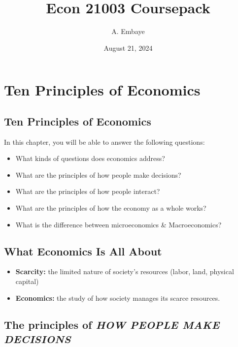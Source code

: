 \documentclass[
]{book}
\title{Econ 21003 Coursepack}
\author{A. Embaye}
\date{August 21, 2024}
\begin{document}
\maketitle

{
\setcounter{tocdepth}{0}
\tableofcontents
}
\hypertarget{ten-principles-of-economics}{%
\chapter{Ten Principles of Economics}\label{ten-principles-of-economics}}

\hypertarget{ten-principles-of-economics-1}{%
\section{Ten Principles of Economics}\label{ten-principles-of-economics-1}}

In this chapter, you will be able to answer the following questions:

\begin{itemize}
\item
  What kinds of questions does economics address?
\item
  What are the principles of how people make decisions?
\item
  What are the principles of how people interact?
\item
  What are the principles of how the economy as a whole works?
\item
  What is the difference between microeconomics \& Macroeconomics?
\end{itemize}

\hypertarget{what-economics-is-all-about}{%
\section{What Economics Is All About}\label{what-economics-is-all-about}}

\begin{itemize}
\item
  \textbf{Scarcity:} the limited nature of society's resources (labor, land, physical capital)
\item
  \textbf{Economics:} the study of how society manages its scarce resources.
\end{itemize}

\hypertarget{the-principles-of-how-people-make-decisions}{%
\section{\texorpdfstring{The principles of \textbf{\emph{HOW PEOPLE MAKE DECISIONS}}}{The principles of HOW PEOPLE MAKE DECISIONS}}\label{the-principles-of-how-people-make-decisions}}
\end{document}
